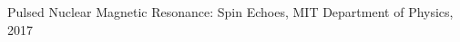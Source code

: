\begin{newbibliography}
	\item {}\label{bib:textbook}
	\item Pulsed Nuclear Magnetic Resonance: Spin Echoes, MIT Department of Physics, 2017\label{bib:mit}
\end{newbibliography}